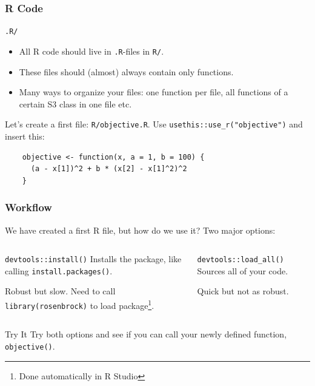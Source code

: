 \documentclass[aspectratio=1610,onlytextwidth]{beamer}
\begin{document}
\begin{frame}[c,fragile]
  \frametitle{R Code}

  \begin{block}{\texttt{.R/}}
    \begin{itemize}
      \item All R code should live in \texttt{.R}-files in \texttt{R/}.
      \item These files should (almost) always contain \alert{only} functions.
      \item Many ways to organize your files: one function per file, all functions
            of a certain S3 class in one file etc.
    \end{itemize}
  \end{block}

  \pause\bigskip

  Let's create a first file: \texttt{R/objective.R}. Use \lstinline{usethis::use_r("objective")} and insert this:

  \begin{lstlisting}
    objective <- function(x, a = 1, b = 100) {
      (a - x[1])^2 + b * (x[2] - x[1]^2)^2
    }
  \end{lstlisting}
\end{frame}

\begin{frame}[c,fragile]
  \frametitle{Workflow}
  We have created a first R file, but how do we use it? Two major options:

  \begin{columns}[T]
    \begin{column}{0.45\textwidth}
      \begin{block}{\lstinline{devtools::install()}}
        Installs the package, like calling \lstinline{install.packages()}.

        \medskip\pause

        Robust but slow. Need to call \lstinline{library(rosenbrock)}
        to load package\footnote{Done automatically in R Studio}.
      \end{block}
    \end{column}

    \pause

    \begin{column}{0.45\textwidth}
      \begin{block}{\lstinline{devtools::load_all()}}
        Sources all of your code.

        \medskip

        Quick but not as robust.

      \end{block}
    \end{column}
  \end{columns}

  \pause\bigskip

  \begin{block}{Try It}
    Try both options and see if you can call your newly defined function, \lstinline{objective()}.
  \end{block}
\end{frame}
\end{document}
